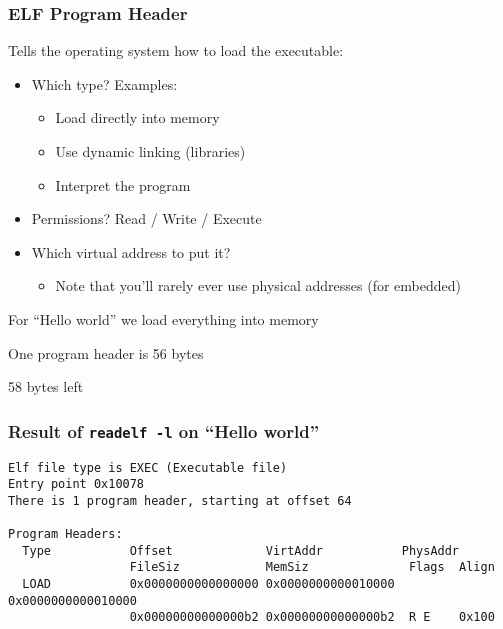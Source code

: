   \begin{frame}
    \frametitle{ELF Program Header}

    Tells the operating system how to load the executable:

    \begin{itemize}
      \item Which type? Examples:
        \begin{itemize}
          \item Load directly into memory
          \item Use dynamic linking (libraries)
          \item Interpret the program
        \end{itemize}
      \item Permissions? Read / Write / Execute
      \item Which virtual address to put it?
        \begin{itemize}
          \item Note that you'll rarely ever use physical addresses (for embedded)
        \end{itemize}
    \end{itemize}

    \vspace{2em}

    For ``Hello world'' we load everything into memory

    \hspace{2em} One program header is 56 bytes

    \hspace{4em} 58 bytes left
  \end{frame}

  \begin{frame}[fragile]
    \frametitle{Result of \texttt{readelf -l} on ``Hello world''}

    \begin{lstlisting}[basicstyle=\scriptsize\ttfamily]
Elf file type is EXEC (Executable file)
Entry point 0x10078
There is 1 program header, starting at offset 64

Program Headers:
  Type           Offset             VirtAddr           PhysAddr
                 FileSiz            MemSiz              Flags  Align
  LOAD           0x0000000000000000 0x0000000000010000 0x0000000000010000
                 0x00000000000000b2 0x00000000000000b2  R E    0x100
    \end{lstlisting}
  \end{frame}

